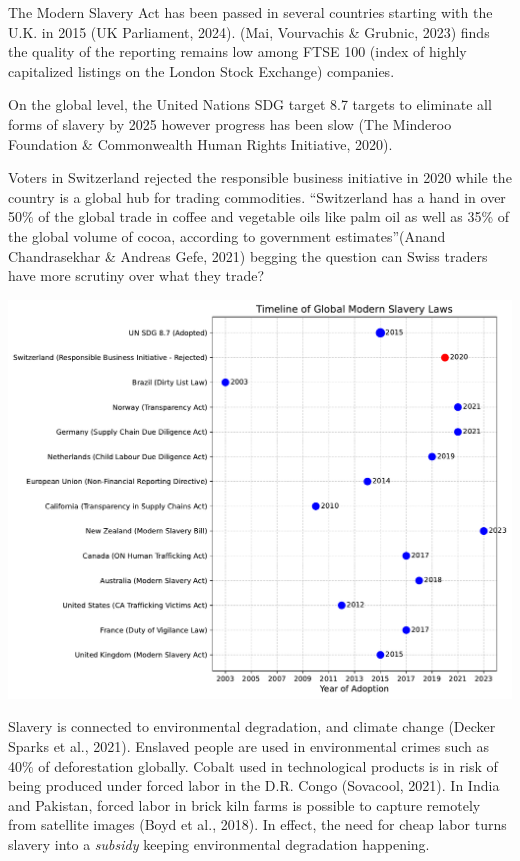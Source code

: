 \documentclass[
  letterpaper,
  DIV=11,
  numbers=noendperiod]{scrartcl}
\begin{document}
The Modern Slavery Act has been passed in several countries starting
with the U.K. in 2015 (UK Parliament, 2024). (Mai, Vourvachis \&
Grubnic, 2023) finds the quality of the reporting remains low among FTSE
100 (index of highly capitalized listings on the London Stock Exchange)
companies.

On the global level, the United Nations SDG target 8.7 targets to
eliminate all forms of slavery by 2025 however progress has been slow
(The Minderoo Foundation \& Commonwealth Human Rights Initiative, 2020).

Voters in Switzerland rejected the responsible business initiative in
2020 while the country is a global hub for trading commodities.
``Switzerland has a hand in over 50\% of the global trade in coffee and
vegetable oils like palm oil as well as 35\% of the global volume of
cocoa, according to government estimates''(Anand Chandrasekhar \&
Andreas Gefe, 2021) begging the question can Swiss traders have more
scrutiny over what they trade?

\includegraphics{_thesis_files/figure-pdf/cell-58-output-1.pdf}

Slavery is connected to environmental degradation, and climate change
(Decker Sparks et al., 2021). Enslaved people are used in environmental
crimes such as 40\% of deforestation globally. Cobalt used in
technological products is in risk of being produced under forced labor
in the D.R. Congo (Sovacool, 2021). In India and Pakistan, forced labor
in brick kiln farms is possible to capture remotely from satellite
images (Boyd et al., 2018). In effect, the need for cheap labor turns
slavery into a \emph{subsidy} keeping environmental degradation
happening.
\end{document}
